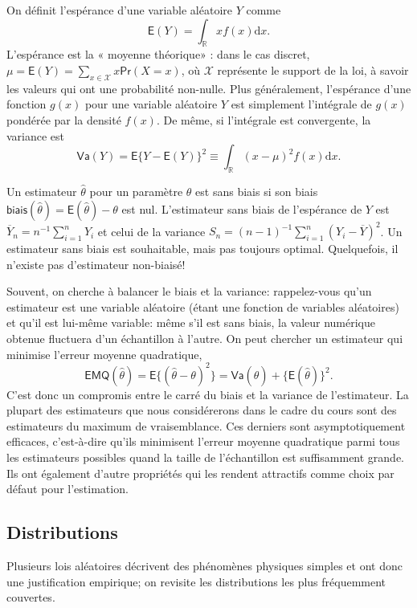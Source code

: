 \documentclass[
  11pt,
  letterpaper,
]{book}
\theoremstyle{definition}
\theoremstyle{definition}
\theoremstyle{definition}
\theoremstyle{remark}
\begin{document}
On définit l'espérance d'une variable aléatoire \(Y\) comme \[\mathsf{E}(Y)=\int_{\mathbb{R}} x f(x) \mathrm{d} x.\]
L'espérance est la « moyenne théorique» : dans le cas discret, \(\mu = \mathsf{E}(Y)=\sum_{x \in \mathcal{X}} x \mathsf{Pr}(X=x)\), où \(\mathcal{X}\) représente le support de la loi, à savoir les valeurs qui ont une probabilité non-nulle. Plus généralement, l'espérance d'une fonction \(g(x)\) pour une variable aléatoire \(Y\) est simplement l'intégrale de \(g(x)\) pondérée par la densité \(f(x)\). De même, si l'intégrale est convergente, la variance est
\[\mathsf{Va}(Y)=\mathsf{E}\{Y-\mathsf{E}(Y)\}^2 \equiv \int_{\mathbb{R}} (x-\mu)^2 f(x) \mathrm{d} x.\]

Un estimateur \(\hat{\theta}\) pour un paramètre \(\theta\) est sans biais si son biais \(\mathsf{biais}(\hat{\theta})=\mathsf{E}(\hat{\theta})- \theta\) est nul.
L'estimateur sans biais de l'espérance de \(Y\) est \(\overline{Y}_n = n^{-1} \sum_{i=1}^n Y_i\) et celui de la variance \(S_n = (n-1)^{-1} \sum_{i=1}^n (Y_i-\overline{Y})^2\). Un estimateur sans biais est souhaitable, mais pas toujours optimal. Quelquefois, il n'existe pas d'estimateur non-biaisé!

Souvent, on cherche à balancer le biais et la variance: rappelez-vous qu'un estimateur est une variable aléatoire (étant une fonction de variables aléatoires) et qu'il est lui-même variable: même s'il est sans biais, la valeur numérique obtenue fluctuera d'un échantillon à l'autre. On peut chercher un estimateur qui minimise l'erreur moyenne quadratique, \[\mathsf{EMQ}(\hat{\theta}) = \mathsf{E}\{(\hat{\theta}-\theta)^2\}=\mathsf{Va}(\hat{\theta}) + \{\mathsf{E}(\hat{\theta})\}^2.\]
C'est donc un compromis entre le carré du biais et la variance de l'estimateur.
La plupart des estimateurs que nous considérerons dans le cadre du cours sont
des estimateurs du maximum de vraisemblance. Ces derniers sont asymptotiquement efficaces, c'est-à-dire qu'ils minimisent l'erreur moyenne quadratique parmi tous les estimateurs possibles quand la taille de l'échantillon est suffisamment grande. Ils ont également d'autre propriétés qui les rendent attractifs comme choix par défaut pour l'estimation.

\hypertarget{distributions}{%
\subsection{Distributions}\label{distributions}}

Plusieurs lois aléatoires décrivent des phénomènes physiques simples et ont donc une justification empirique; on revisite les distributions les plus fréquemment couvertes.
\end{document}
